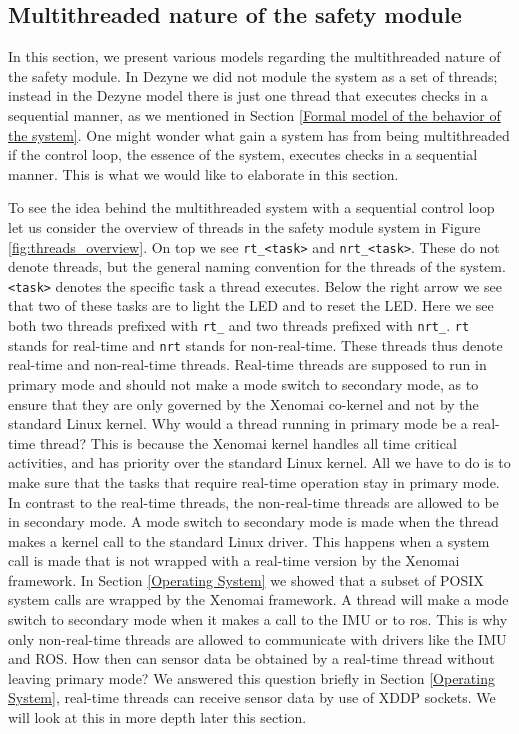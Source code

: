 \documentclass[12pt]{scrreprt}
\begin{document}
\subsection{Multithreaded nature of the safety module}
\label{Multithreaded nature of the safety module}

In this section, we present various models regarding the multithreaded nature of the safety module. In Dezyne we did not module the system as a set of threads; instead in the Dezyne model there is just one thread that executes checks in a sequential manner, as we mentioned in Section \ref{Formal model of the behavior of the system}. One might wonder what gain a system has from being multithreaded if the control loop, the essence of the system, executes checks in a sequential manner. This is what we would like to elaborate in this section.
\par
To see the idea behind the multithreaded system with a sequential control loop let us consider the overview of threads in the safety module system in Figure \ref{fig:threads_overview}. On top we see \texttt{rt\_<task>} and \texttt{nrt\_<task>}. These do not denote threads, but the general naming convention for the threads of the system. \texttt{<task>} denotes the specific task a thread executes. Below the right arrow we see that two of these tasks are to light the LED and to reset the LED. Here we see both two threads prefixed with \texttt{rt\_} and two threads prefixed with \texttt{nrt\_}. \texttt{rt} stands for real-time and \texttt{nrt} stands for non-real-time. These threads thus denote real-time and non-real-time threads. Real-time threads are supposed to run in primary mode and should not make a mode switch to secondary mode, as to ensure that they are only governed by the Xenomai co-kernel and not by the standard Linux kernel. Why would a thread running in primary mode be a real-time thread? This is because the Xenomai kernel handles all time critical activities, and has priority over the standard Linux kernel. All we have to do is to make sure that the tasks that require real-time operation stay in primary mode. In contrast to the real-time threads, the non-real-time threads are allowed to be in secondary mode. A mode switch to secondary mode is made when the thread makes a kernel call to the standard Linux driver. This happens when a system call is made that is not wrapped with a real-time version by the Xenomai framework. In Section \ref{Operating System} we showed that a subset of POSIX system calls are wrapped by the Xenomai framework. A thread will make a mode switch to secondary mode when it makes a call to the IMU or to \acrshort{ros}. This is why only non-real-time threads are allowed to communicate with drivers like the IMU and ROS. How then can sensor data be obtained by a real-time thread without leaving primary mode? We answered this question briefly in Section \ref{Operating System}, real-time threads can receive sensor data by use of XDDP sockets. We will look at this in more depth later this section.
\end{document}
